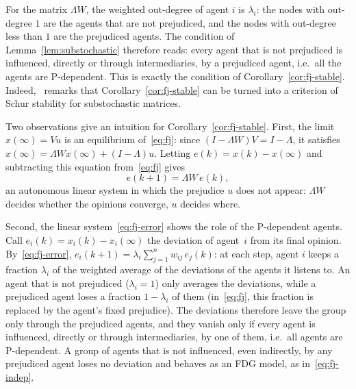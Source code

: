 For the matrix $\Lambda W$, the weighted out-degree of agent $i$ is $\lambda_i$: the nodes with
out-degree $1$ are the agents that are not prejudiced, and the nodes with out-degree
less than $1$ are the prejudiced agents. The condition of
Lemma~\ref{lem:substochastic} therefore reads: every agent that is not prejudiced is
influenced, directly or through intermediaries, by a prejudiced agent, i.e.\ all the
agents are P-dependent. This is exactly the condition of
Corollary~\ref{cor:fj-stable}. Indeed,~\cite{proskurnikov2017tutorial} remarks that
Corollary~\ref{cor:fj-stable} can be turned into a criterion of Schur stability for
substochastic matrices.

Two observations give an intuition for Corollary~\ref{cor:fj-stable}. First,
the limit $x(\infty) = Vu$ is an equilibrium of~\eqref{eq:fj}: since
$(I - \Lambda W)V = I - \Lambda$, it satisfies $x(\infty) = \Lambda W x(\infty) + (I - \Lambda)u$. Letting
$e(k) = x(k) - x(\infty)$ and subtracting this equation from~\eqref{eq:fj} gives
\begin{equation}\label{eq:fj-error}
  e(k+1) = \Lambda W\, e(k),
\end{equation}
an autonomous linear system in which the prejudice $u$ does not appear: $\Lambda W$
decides whether the opinions converge, $u$ decides where.

Second, the linear system~\eqref{eq:fj-error} shows the role of the P-dependent
agents. Call $e_i(k) = x_i(k) - x_i(\infty)$ the deviation of agent~$i$ from its final
opinion. By~\eqref{eq:fj-error}, $e_i(k+1) = \lambda_i \sum_{j=1}^{n} w_{ij}\, e_j(k)$: at
each step, agent $i$ keeps a fraction $\lambda_i$ of the weighted average of the
deviations of the agents it listens to.
 An agent that is not prejudiced
($\lambda_i = 1$) only averages the deviations, while a prejudiced agent loses a
fraction $1-\lambda_i$ of them (in~\eqref{eq:fj}, this fraction is replaced by the
agent's fixed prejudice). The deviations therefore leave the group only through the
prejudiced agents, and they vanish only if every agent is influenced, directly or
through intermediaries, by one of them, i.e.\ all agents are P-dependent. A group of
agents that is not influenced, even indirectly, by any prejudiced agent loses no
deviation and behaves as an FDG model, as in~\eqref{eq:fj-indep}.

